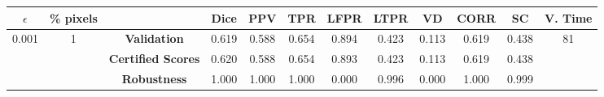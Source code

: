 \begin{longtable}{ c  c | c | c  c  c  c  c  c  c c c}
\toprule \textbf{$\epsilon$} & \textbf{\% pixels} & & \textbf{Dice} & \textbf{PPV} & \textbf{TPR} & \textbf{LFPR} & \textbf{LTPR} & \textbf{VD} & \textbf{CORR} & \textbf{SC} & \textbf{V. Time} \\
\midrule 
\multirow{3}{*}{0.001}  & \multirow{3}{*}{1} &\textbf{Validation} & 0.619 & 0.588 & 0.654 & 0.894 & 0.423 & 0.113 & 0.619 & 0.438 & \multirow{3}{*}{81} \\
 & & \textbf{Certified Scores} & 0.620 & 0.588 & 0.654 & 0.893 & 0.423 & 0.113 & 0.619 & 0.438 & \\
& & \textbf{Robustness} & 1.000 & 1.000 & 1.000 & 0.000 & 0.996 & 0.000 & 1.000 & 0.999 & \\
\end{longtable}